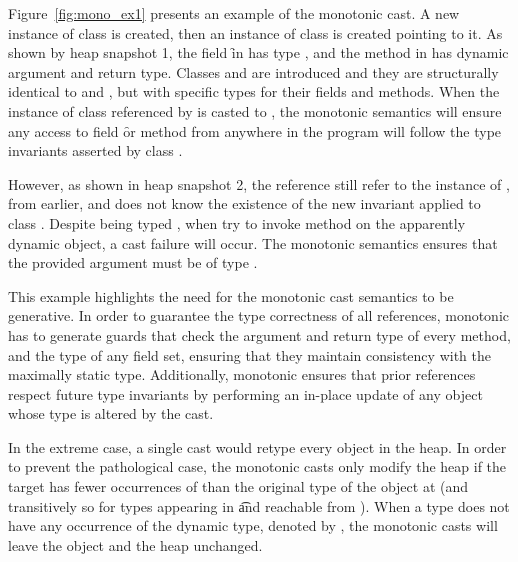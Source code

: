 \documentclass[a4paper,USenglish]{tex/lipics-v2016}
\begin{document}
Figure~\ref{fig:mono_ex1} presents an example of the monotonic cast. 
A new instance of class \D is created, then an instance of class \C 
is created pointing to it. As shown by heap snapshot 1, 
the field \f in \C has type \any, and the method \m in \D has dynamic 
argument and return type. Classes \E and  are introduced and they are structurally 
identical to \C and \D, but with specific types for their fields and methods. 
When the instance of class \C referenced by \a is casted to \E, 
the monotonic semantics will ensure any access to field \f or method \m from 
anywhere in the program will follow the type invariants asserted by class \E.

However, as shown in heap snapshot 2, the reference  still refer to 
the instance of \D, from earlier, and 
does not know the existence of the new invariant applied to class \D. Despite being
typed \any, when  try to invoke method \m on the apparently dynamic 
object, a cast failure will occur. The monotonic semantics ensures that the
provided argument must be of type \E. 

This example highlights the need for the monotonic cast semantics to be generative.
In order to guarantee the type correctness of all references, monotonic has to generate guards
that check the argument and return type of every method, and the
type of any field set, ensuring that they maintain consistency with the 
maximally static type. Additionally, monotonic ensures that 
prior references respect future type invariants by performing an in-place update
of any object whose type is altered by the cast.

In the extreme case, a single cast would retype every object in the heap. 
In order to prevent the pathological case, the monotonic casts only modify the heap
if the target \C has fewer occurrences of \any than the original type of the
object at \a (and transitively so for types appearing in \t and reachable
from \a).  When a type \C does not have any occurrence of the dynamic type,
denoted by \statictype\C\K\V, the monotonic casts will leave the object and the
heap unchanged.

\end{document}
